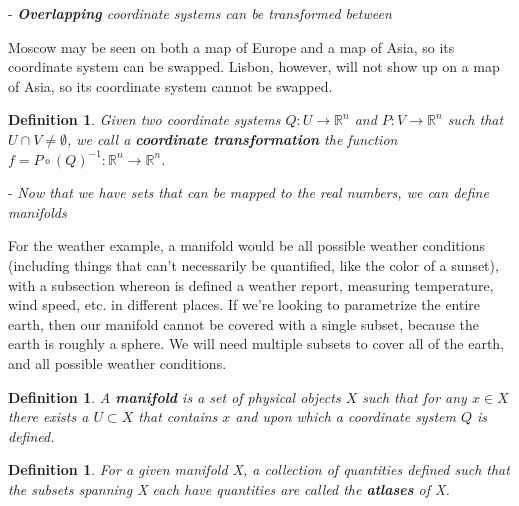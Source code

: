\documentclass{book}
\newtheorem{defn}[equation]{Definition}
\begin{document}
- \emph{\textbf{Overlapping} coordinate systems can be transformed between}

Moscow may be seen on both a map of Europe and a map of Asia, so its coordinate system can be swapped. Lisbon, however, will not show up on a map of Asia, so its coordinate system cannot be swapped. 


\begin{defn}
	Given two coordinate systems  $Q : U \to \mathbb{R}^n$ and $P : V \to \mathbb{R}^n$ such that $U \cap V \neq \emptyset$, we call a \textbf{coordinate transformation} the function $f = P \circ (Q)^{-1} : \mathbb{R}^n \to \mathbb{R}^n$.
\end{defn}




- \emph{Now that we have sets that can be mapped to the real numbers, we can define manifolds}

For the weather example, a manifold would be all possible weather conditions (including things that can't necessarily be quantified, like the color of a sunset), with a subsection whereon is defined a weather report, measuring temperature, wind speed, etc. in different places. If we're looking to parametrize the entire earth, then our manifold cannot be covered with a single subset, because the earth is roughly a sphere. We will need multiple subsets to cover all of the earth, and all possible weather conditions. 


 
\begin{defn}
	A \textbf{manifold} is a set of physical objects $X$ such that for any $x \in X$ there exists a $U \subset X$ that contains $x$ and upon which a coordinate system $Q$ is defined.
\end{defn}

\begin{defn}
	For a given manifold X, a collection of quantities defined such that the subsets spanning X each have quantities are called the \textbf{atlases} of X. 
\end{defn}
\end{document}
